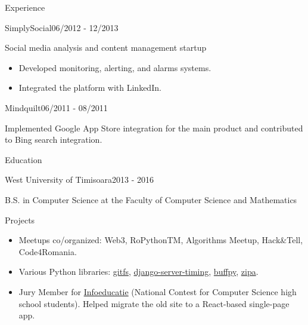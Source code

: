 \documentclass{resume}
\begin{document}
\begin{rSection}{Experience}
    \begin{rSubsection}{SimplySocial}{06/2012 - 12/2013}{}{}
        \item Social media analysis and content management startup
        \begin{itemize}
            \setlength\itemsep{-0.3em}
            \item Developed monitoring, alerting, and alarms systems.
            \item Integrated the platform with LinkedIn.
        \end{itemize}
    \end{rSubsection}

    \begin{rSubsection}{Mindquilt}{06/2011 - 08/2011}{}{}
        \item Implemented Google App Store integration for the main product and contributed to Bing search integration.
    \end{rSubsection}

\end{rSection}

\begin{rSection}{Education}
    \begin{rSubsection}{West University of Timisoara}{2013 - 2016}{}{}
    \item B.S. in Computer Science at the Faculty of Computer Science and Mathematics
    \end{rSubsection}
\end{rSection}

\begin{rSection}{Projects}
    \begin{itemize}
       \setlength\itemsep{-0.3em}
       \item Meetups co/organized: Web3, RoPythonTM, Algorithms Meetup, Hack\&Tell, Code4Romania.
       \item Various Python libraries: \href{https://github.com/presslabs/gitfs}{gitfs}, \href{https://github.com/vtemian/django-server-timing}{django-server-timing}, \href{https://github.com/vtemian/buffpy}{buffpy}, \href{https://github.com/presslabs/zipa}{zipa}.
       \item Jury Member for \href{https://infoeducatie.ro}{Infoeducatie} (National Contest for Computer Science high school students). Helped migrate the old site to a React-based single-page app.
    \end{itemize}
\end{rSection}
\end{document}

